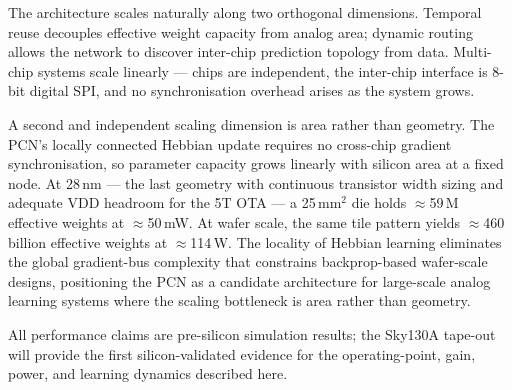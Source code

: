 \documentclass[journal,10pt,twoside]{IEEEtran}
\begin{document}
The architecture scales naturally along two orthogonal dimensions.
Temporal reuse decouples effective weight capacity from analog area;
dynamic routing allows the network to discover inter-chip prediction
topology from data.
Multi-chip systems scale linearly — chips are independent, the inter-chip
interface is 8-bit digital SPI, and no synchronisation overhead arises
as the system grows.

A second and independent scaling dimension is area rather than geometry.
The PCN's locally connected Hebbian update requires no cross-chip gradient
synchronisation, so parameter capacity grows linearly with silicon area
at a fixed node.
At 28\,nm — the last geometry with continuous transistor width sizing and
adequate VDD headroom for the 5T OTA — a 25\,mm$^2$ die holds
$\approx$59\,M effective weights at $\approx$50\,mW.
At wafer scale, the same tile pattern yields $\approx$460 billion effective
weights at $\approx$114\,W.
The locality of Hebbian learning eliminates the global gradient-bus
complexity that constrains backprop-based wafer-scale designs, positioning
the PCN as a candidate architecture for large-scale analog learning systems
where the scaling bottleneck is area rather than geometry.

All performance claims are pre-silicon simulation results; the Sky130A
tape-out will provide the first silicon-validated evidence for the
operating-point, gain, power, and learning dynamics described here.



\end{document}
